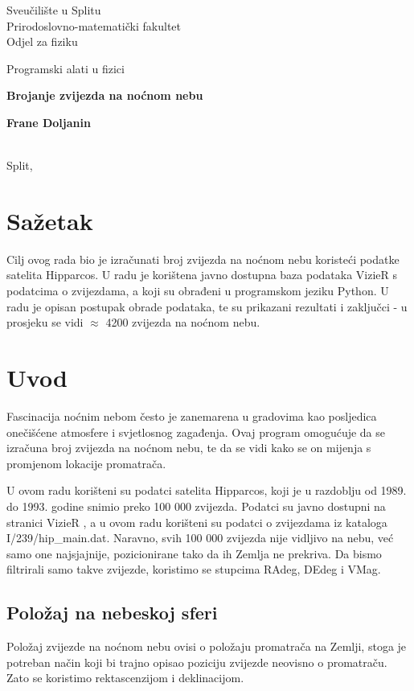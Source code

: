 \documentclass[a4paper,12pt]{article}
\begin{document}
\begin{center}
  Sveučilište u Splitu\\
  Prirodoslovno-matematički fakultet\\
  Odjel za fiziku

  \bigskip
  \bigskip

  \large{Programski alati u fizici}


  \bigskip
  \bigskip

  \textbf{{\Large{Brojanje zvijezda na noćnom nebu}}}
\end{center}
\begin{center}
  \textbf{Frane Doljanin}\\
  \
\end{center}
\begin{center}
  Split, 
\end{center}

\section*{Sažetak}
Cilj ovog rada bio je izračunati broj zvijezda na noćnom nebu koristeći podatke satelita Hipparcos. U radu je korištena javno dostupna baza podataka VizieR \cite{ct:VizieR} s podatcima o zvijezdama, a koji su obrađeni u programskom jeziku Python. U radu je opisan postupak obrade podataka, te su prikazani rezultati i zaključci - u prosjeku se vidi $\approx$ 4200 zvijezda na noćnom nebu.

\section{Uvod}
Fascinacija noćnim nebom često je zanemarena u gradovima kao posljedica onečišćene atmosfere i svjetlosnog zagađenja. Ovaj program omogućuje da se izračuna broj zvijezda na noćnom nebu, te da se vidi kako se on mijenja s promjenom lokacije promatrača.
\par
U ovom radu korišteni su podatci satelita Hipparcos, koji je u razdoblju od 1989. do 1993. godine snimio preko 100 000 zvijezda. Podatci su javno dostupni na stranici VizieR \cite{ct:VizieR}, a u ovom radu korišteni su podatci o zvijezdama iz kataloga I/239/hip\_main.dat.
Naravno, svih 100 000 zvijezda nije vidljivo na nebu, već samo one najsjajnije, pozicionirane tako da ih Zemlja ne prekriva. Da bismo filtrirali samo takve zvijezde, koristimo se stupcima RAdeg, DEdeg i VMag.
\subsection{Položaj na nebeskoj sferi}
Položaj zvijezde na noćnom nebu ovisi o položaju promatrača na Zemlji, stoga je potreban način koji bi trajno opisao poziciju zvijezde neovisno o promatraču. Zato se koristimo rektascenzijom i deklinacijom.
\end{document}
